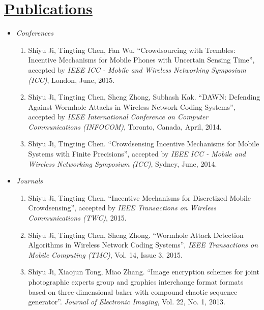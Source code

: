 \documentclass{article}
\newlength{\nL}
\newcommand{\underLineText}[1]{\settowidth{\nL}{#1}\setlength{\nL}{0.8\textwidth-\nL}\underline{{\sc #1}\hspace{\nL}}}
\begin{document}
\section*{\underLineText{Publications}}
\begin{itemize}
\item {\it Conferences}
\begin{enumerate}
\item Shiyu Ji, Tingting Chen, Fan Wu. ``Crowdsourcing with Trembles: Incentive Mechanisms for Mobile Phones with Uncertain Sensing Time'', accepted by {\it IEEE ICC - Mobile and Wireless Networking Symposium (ICC)}, London, June, 2015.

\item Shiyu Ji, Tingting Chen, Sheng Zhong, Subhash Kak. ``DAWN: Defending Against Wormhole Attacks in Wireless Network Coding Systems'', accepted by {\it IEEE International Conference on Computer Communications (INFOCOM)}, Toronto, Canada, April, 2014.

\item Shiyu Ji, Tingting Chen. ``Crowdsensing Incentive Mechanisms for Mobile Systems with Finite Precisions'', accepted by {\it IEEE ICC - Mobile and Wireless Networking Symposium (ICC)}, Sydney, June, 2014.
\end{enumerate}

\item{\it Journals}
\begin{enumerate}
\item Shiyu Ji, Tingting Chen, ``Incentive Mechanisms for Discretized Mobile Crowdsensing'', accepted by {\it IEEE Transactions on Wireless Communications (TWC)}, 2015.

\item Shiyu Ji, Tingting Chen, Sheng Zhong. ``Wormhole Attack Detection Algorithms in Wireless Network Coding Systems'', {\it IEEE Transactions on Mobile Computing (TMC)}, Vol. 14, Issue 3, 2015.

\item Shiyu Ji, Xiaojun Tong, Miao Zhang. ``Image encryption schemes for joint photographic experts group and graphics interchange format formats based on three-dimensional baker with compound chaotic sequence generator''. {\it Journal of Electronic Imaging}, Vol. 22, No. 1, 2013.
\end{enumerate}
\end{itemize}
\end{document}
